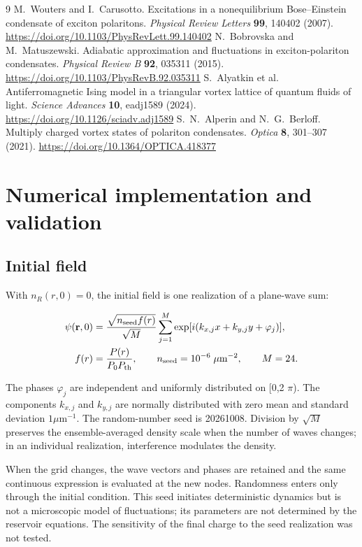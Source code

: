 \documentclass[12pt,a4paper]{article}
\begin{document}
\clearpage
\begin{thebibliography}{9}
M.~Wouters and I.~Carusotto.
Excitations in a nonequilibrium Bose--Einstein condensate of exciton polaritons.
\textit{Physical Review Letters} \textbf{99}, 140402 (2007).
\url{https://doi.org/10.1103/PhysRevLett.99.140402}
N.~Bobrovska and M.~Matuszewski.
Adiabatic approximation and fluctuations in exciton-polariton condensates.
\textit{Physical Review B} \textbf{92}, 035311 (2015).
\url{https://doi.org/10.1103/PhysRevB.92.035311}
S.~Alyatkin et al.
Antiferromagnetic Ising model in a triangular vortex lattice of quantum fluids of light.
\textit{Science Advances} \textbf{10}, eadj1589 (2024).
\url{https://doi.org/10.1126/sciadv.adj1589}
S.~N.~Alperin and N.~G.~Berloff.
Multiply charged vortex states of polariton condensates.
\textit{Optica} \textbf{8}, 301--307 (2021).
\url{https://doi.org/10.1364/OPTICA.418377}
\end{thebibliography}

\clearpage
\appendix
\section{Numerical implementation and validation}\label{sec:A}

\subsection{Initial field}\label{sec:A.1}

With $n_{R}(r,0)=0$, the initial field is one realization of a plane-wave sum:

\[
\begin{aligned}\psi(\mathbf r,0)&=\frac{\sqrt{n_{\rm seed}f(r)}}{\sqrt M}\sum_{j=1}^{M}\exp[i(k_{x,j}x+k_{y,j}y+\varphi_j)],\\f(r)&=\frac{P(r)}{P_0P_{\rm th}},\qquad n_{\rm seed}=10^{-6}\;\mu\mathrm m^{-2},\qquad M=24.\end{aligned}
\]

The phases $\varphi_{j}$ are independent and uniformly distributed on [0,2 $\pi$). The components $k_{x,j}$ and $k_{y,j}$ are normally distributed with zero mean and standard deviation $1 \mu\mathrm m^{-1}$. The random-number seed is 20261008. Division by $\sqrt{M}$ preserves the ensemble-averaged density scale when the number of waves changes; in an individual realization, interference modulates the density.

When the grid changes, the wave vectors and phases are retained and the same continuous expression is evaluated at the new nodes. Randomness enters only through the initial condition. This seed initiates deterministic dynamics but is not a microscopic model of fluctuations; its parameters are not determined by the reservoir equations. The sensitivity of the final charge to the seed realization was not tested.
\end{document}
